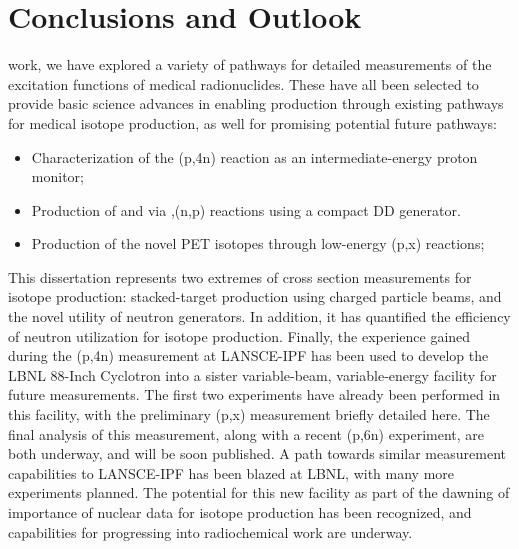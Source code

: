 \chapter{Conclusions and Outlook}

 work, we have explored a variety of pathways for detailed measurements of the excitation functions of medical radionuclides. 
These have all been selected to provide basic science advances in enabling production through  existing pathways for medical isotope production, as well for promising potential future pathways:
\begin{itemize}
 \item Characterization of the (p,4n) reaction as an intermediate-energy proton monitor;
 \item Production of   and  via ,(n,p) reactions using a compact DD generator.
  \item Production of the   novel PET isotopes through low-energy (p,x) reactions;
\end{itemize}

This dissertation represents  two extremes of cross section measurements for isotope production: stacked-target production using charged particle beams, and the novel utility of neutron generators.
In addition, it has quantified the efficiency of  neutron utilization for isotope production.
Finally, the experience gained during the (p,4n)  measurement at LANSCE-IPF has been used to develop the LBNL 88-Inch Cyclotron into a  sister variable-beam, variable-energy facility for future measurements.
The first two experiments have already been performed in this facility, with the preliminary (p,x) measurement briefly detailed here.
The final analysis of this measurement, along with a recent (p,6n) experiment, are both underway, and will be soon published.
A path towards  similar measurement capabilities to LANSCE-IPF has been blazed at LBNL, with many more experiments planned.
The potential for this new facility as part of the dawning of importance of nuclear data for isotope production has been recognized, and capabilities for progressing into radiochemical work are underway.


